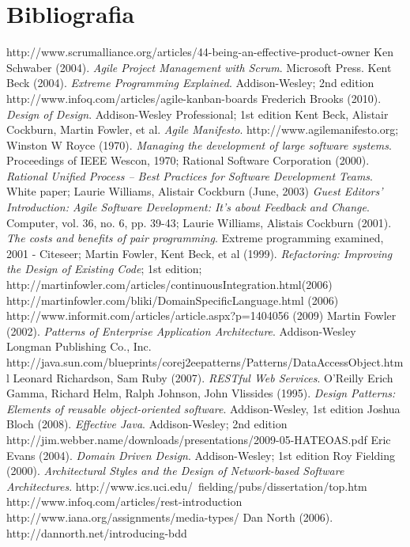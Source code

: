 \section{Bibliografia}

\begin{thebibliography}{30} 

 http://www.scrumalliance.org/articles/44-being-an-effective-product-owner
 Ken Schwaber (2004). \textit{Agile Project Management with Scrum}. Microsoft Press.
 Kent Beck (2004). \textit{Extreme Programming Explained}. Addison-Wesley; 2nd edition
 http://www.infoq.com/articles/agile-kanban-boards
 Frederich Brooks (2010). \textit{Design of Design}. Addison-Wesley Professional; 1st edition
 Kent Beck, Alistair Cockburn, Martin Fowler, et al. \textit{Agile Manifesto}. http://www.agilemanifesto.org;
 Winston W Royce (1970). \textit{Managing the development of large software systems}.
Proceedings of IEEE Wescon, 1970;
 Rational Software Corporation (2000). \textit{Rational Unified Process -- Best Practices for Software Development Teams}. White paper;
 Laurie Williams, Alistair Cockburn (June, 2003) \textit{Guest Editors' Introduction: Agile Software Development: It's about Feedback and Change}. Computer, vol. 36, no. 6, pp. 39-43;
 Laurie Williams, Alistais Cockburn (2001). \textit{The costs and benefits of pair programming}. Extreme programming examined, 2001 - Citeseer;
 Martin Fowler, Kent Beck, et al (1999). \textit{Refactoring: Improving the Design of Existing Code}; 1st edition;
 http://martinfowler.com/articles/continuousIntegration.html(2006)
 http://martinfowler.com/bliki/DomainSpecificLanguage.html (2006)
 http://www.informit.com/articles/article.aspx?p=1404056 (2009)
 Martin Fowler (2002). \textit{Patterns of Enterprise Application Architecture}.  Addison-Wesley Longman Publishing Co., Inc.
 http://java.sun.com/blueprints/corej2eepatterns/Patterns/DataAccessObject.html
 Leonard Richardson, Sam Ruby (2007). \textit{RESTful Web Services}. O'Reilly
 Erich Gamma, Richard Helm, Ralph Johnson, John Vlissides (1995). \textit{Design Patterns: Elements of reusable object-oriented software}. Addison-Wesley, 1st edition
 Joshua Bloch (2008). \textit{Effective Java}. Addison-Wesley; 2nd edition
 http://jim.webber.name/downloads/presentations/2009-05-HATEOAS.pdf
 Eric Evans (2004). \textit{Domain Driven Design}. Addison-Wesley; 1st edition 
 Roy Fielding (2000). \textit{Architectural Styles and the Design of Network-based Software Architectures}. http://www.ics.uci.edu/~fielding/pubs/dissertation/top.htm
 http://www.infoq.com/articles/rest-introduction
 http://www.iana.org/assignments/media-types/
 Dan North (2006). http://dannorth.net/introducing-bdd

\end{thebibliography}
